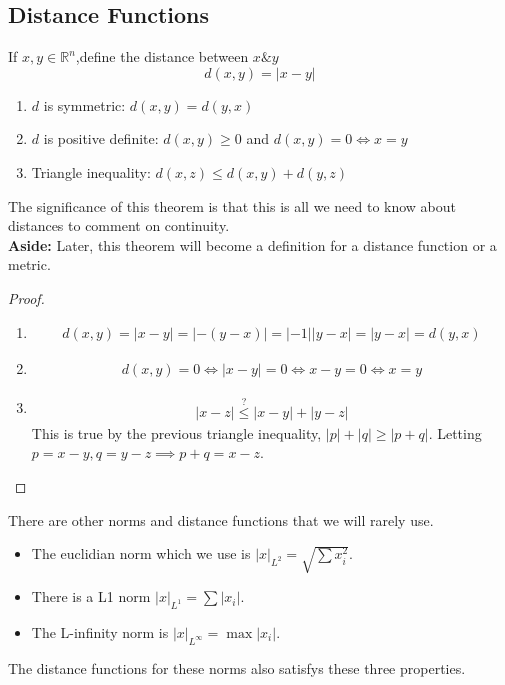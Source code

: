 \documentclass[a4paper]{article}
\numberwithin{equation}{section}
\newcommand{\R}{\mathbb{R}}
\begin{document}
\subsection{Distance Functions}
\begin{definition}
    If $x, y\in\R^n$,define the distance between $x\&y$
    \begin{equation}
        d(x,y)=|x-y|
    \end{equation}
\end{definition}
\begin{theorem}
    \begin{enumerate}
        \item $d$ is symmetric: $d(x,y)=d(y,x)$
        \item $d$ is positive definite: $d(x,y)\geq0$ and $d(x,y)=0\iff x=y$
        \item Triangle inequality: $d(x,z)\leq d(x,y)+d(y,z)$
    \end{enumerate}
    The significance of this theorem is that this is all we need to know about distances to comment on continuity.\\
    \textbf{Aside:} Later, this theorem will become a definition for a distance function or a metric.
    \begin{proof}
        \begin{enumerate}
            \item \begin{align}
                d(x,y)=|x-y|=|-(y-x)|=|-1||y-x|=|y-x|=d(y,x)
            \end{align}
            \item \begin{align}
                d(x,y)=0\iff |x-y|=0\iff x-y=0\iff x=y
            \end{align}
            \item \begin{align}
                |x-z|\stackrel{?}{\leq}|x-y|+|y-z|
            \end{align}
            This is true by the previous triangle inequality, $|p|+|q|\geq|p+q|$. Letting $p=x-y,q=y-z\implies p+q=x-z$.
        \end{enumerate}
    \end{proof}

    There are other norms and distance functions that we will rarely use.

    \begin{itemize}
        \item The euclidian norm which we use is $|x|_{L^2}=\sqrt{\sum x_i^2}$.
        \item There is a L1 norm $|x|_{L^1}=\sum|x_i|$.
        \item The L-infinity norm is $|x|_{L^\infty}=\max |x_i|$.
    \end{itemize}
    The distance functions for these norms also satisfys these three properties.
\end{theorem}
\end{document}
